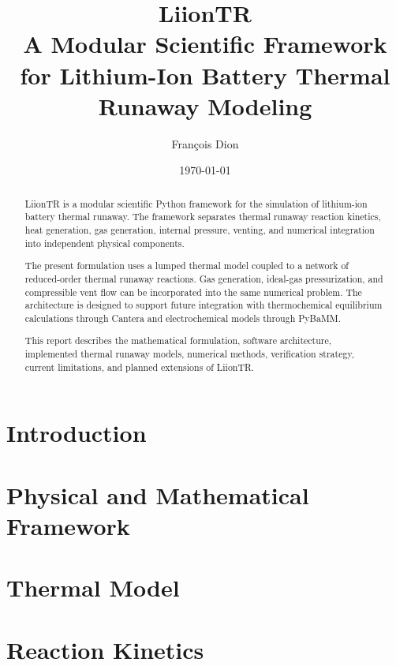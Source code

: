 \documentclass[11pt,a4paper]{article}
\title{
    \textbf{LiionTR}\\[0.5em]
    A Modular Scientific Framework for Lithium-Ion Battery Thermal Runaway Modeling
}
\author{François Dion}
\date{\today}
\begin{document}
\maketitle

\begin{abstract}

LiionTR is a modular scientific Python framework for the simulation of
lithium-ion battery thermal runaway. The framework separates thermal
runaway reaction kinetics, heat generation, gas generation, internal
pressure, venting, and numerical integration into independent physical
components.

The present formulation uses a lumped thermal model coupled to a network
of reduced-order thermal runaway reactions. Gas generation, ideal-gas
pressurization, and compressible vent flow can be incorporated into the
same numerical problem. The architecture is designed to support future
integration with thermochemical equilibrium calculations through Cantera
and electrochemical models through PyBaMM.

This report describes the mathematical formulation, software
architecture, implemented thermal runaway models, numerical methods,
verification strategy, current limitations, and planned extensions of
LiionTR.

\end{abstract}

\tableofcontents

\newpage



\newpage

\section{Introduction}
\label{sec:introduction}


\section{Physical and Mathematical Framework}
\label{sec:framework}


\section{Thermal Model}
\label{sec:thermal}


\section{Reaction Kinetics}
\label{sec:kinetics}

\end{document}
